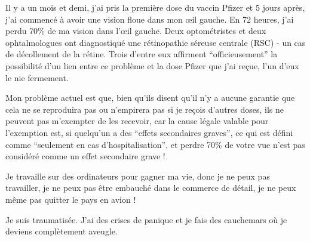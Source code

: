 Il y a un mois et demi, j'ai pris la première dose du vaccin Pfizer et 5 jours
après, j'ai commencé à avoir une vision floue dans mon œil gauche. En 72 heures,
j'ai perdu 70\% de ma vision dans l'œil gauche. Deux optométristes et deux
ophtalmologues ont diagnostiqué une rétinopathie séreuse centrale (RSC) - un cas
de décollement de la rétine. Trois d'entre eux affirment “officieusement” la
possibilité d'un lien entre ce problème et la dose Pfizer que j'ai reçue, l'un
d'eux le nie fermement.

Mon problème actuel est que, bien qu'ils disent qu'il n'y a aucune garantie que
cela ne se reproduira pas ou n'empirera pas si je reçois d'autres doses, ils ne
peuvent pas m'exempter de les recevoir, car la cause légale valable pour
l'exemption est, si quelqu'un a des “effets secondaires graves”, ce qui est
défini comme “seulement en cas d'hospitalisation”, et perdre 70\% de votre vue
n'est pas considéré comme un effet secondaire grave !

Je travaille sur des ordinateurs pour gagner ma vie, donc je ne peux pas
travailler, je ne peux pas être embauché dans le commerce de détail, je ne peux
même pas quitter le pays en avion !

Je suis traumatisée. J'ai des crises de panique et je fais des cauchemars où je
deviens complètement aveugle.

